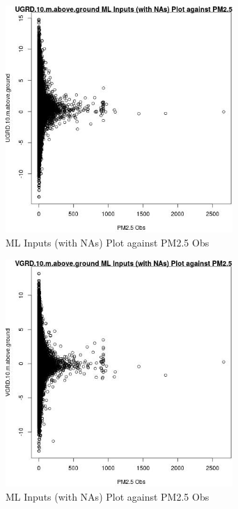 \begin{figure} 
\centering  
\includegraphics[width=0.77\textwidth]{Code_Outputs/Report_ML_input_PM25_Step4_part_e_de_duplicated_aves_compiled_2019-05-21wNAs_UGRD10mabovegroundvPM25_Obs.jpg} 
\caption{\label{fig:Report_ML_input_PM25_Step4_part_e_de_duplicated_aves_compiled_2019-05-21wNAsUGRD10mabovegroundvPM25_Obs}ML Inputs (with NAs) Plot against PM2.5 Obs} 
\end{figure} 
 

\begin{figure} 
\centering  
\includegraphics[width=0.77\textwidth]{Code_Outputs/Report_ML_input_PM25_Step4_part_e_de_duplicated_aves_compiled_2019-05-21wNAs_VGRD10mabovegroundvPM25_Obs.jpg} 
\caption{\label{fig:Report_ML_input_PM25_Step4_part_e_de_duplicated_aves_compiled_2019-05-21wNAsVGRD10mabovegroundvPM25_Obs}ML Inputs (with NAs) Plot against PM2.5 Obs} 
\end{figure} 
 

